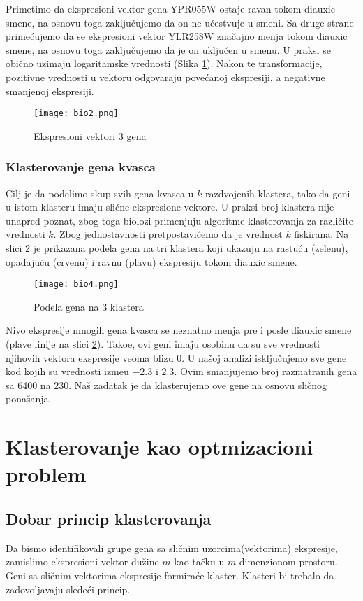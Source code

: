 Primetimo da ekspresioni vektor gena YPR055W ostaje ravan tokom diauxic smene, na osnovu toga zaključujemo da on ne učestvuje u smeni. Sa druge strane primećujemo da se ekspresioni vektor YLR258W značajno menja tokom diauxic smene, na osnovu toga zaključujemo da je on uključen u smenu. U praksi se obično uzimaju logaritamske vrednosti (Slika \ref{slika 3}). Nakon te transformacije, pozitivne vrednosti u vektoru odgovaraju povećanoj ekspresiji, a negativne smanjenoj ekspresiji.
\begin{figure}[h]
    \centering
    \texttt{[image: bio2.png]}
    \caption{Ekspresioni vektori 3 gena}
    \label{slika 3}
\end{figure}

\subsubsection{Klasterovanje gena kvasca}
Cilj je da podelimo skup svih gena kvasca u $k$ razdvojenih klastera, tako da geni u istom klasteru imaju slične ekspresione vektore. U praksi broj klastera nije unapred poznat, zbog toga biolozi primenjuju algoritme klasterovanja za različite vrednosti $k$. Zbog jednostavnosti pretpostavićemo da je vrednost $k$ fiskirana. Na slici \ref{slika 4} je prikazana podela gena na tri klastera koji ukazuju na rastuću (zelenu), opadajuću (crvenu) i ravnu (plavu) ekspresiju tokom diauxic smene.
\begin{figure}[h]
    \centering
    \texttt{[image: bio4.png]}
    \caption{Podela gena na 3 klastera}
    \label{slika 4}
\end{figure}

Nivo ekspresije mnogih gena kvasca se neznatno menja pre i posle diauxic smene (plave linije na slici \ref{slika 4}). Tako\dj e, ovi geni imaju osobinu da su sve vrednosti njihovih vektora ekspresije veoma blizu $0$. U našoj analizi isključujemo sve gene kod kojih su vrednosti izme\dj u $-2.3$ i $2.3$. Ovim smanjujemo broj razmatranih gena sa 6400 na 230. Naš zadatak je da klasterujemo ove gene na osnovu sličnog ponašanja.


\section{Klasterovanje kao optmizacioni problem}
\subsection{Dobar princip klasterovanja}
Da bismo identifikovali grupe gena sa sličnim uzorcima(vektorima) ekspresije, zamislimo ekspresioni vektor dužine $m$ kao tačku u $m$-dimenzionom prostoru. Geni sa sličnim vektorima ekspresije 
formiraće klaster. Klasteri bi trebalo da zadovoljavaju sledeći princip.

